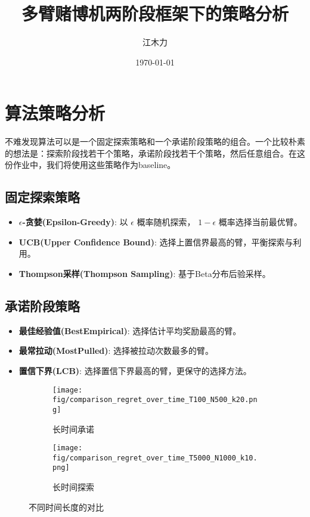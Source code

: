 \documentclass[6pt, a4paper]{ctexart} %
\title{多臂赌博机两阶段框架下的策略分析}
\author{江木力}
\date{\today}
\newcommand{\eps}{\ensuremath{\epsilon}} %
\begin{document}
\maketitle

\section{算法策略分析}
不难发现算法可以是一个固定探索策略和一个承诺阶段策略的组合。一个比较朴素的想法是：探索阶段找若干个策略，承诺阶段找若干个策略，然后任意组合。在这份作业中，我们将使用这些策略作为baseline。

\subsection{固定探索策略}
\begin{itemize}
    \item \textbf{$\eps$-贪婪(Epsilon-Greedy)}: 以 $\eps$ 概率随机探索， $1-\eps$ 概率选择当前最优臂。
    \item \textbf{UCB(Upper Confidence Bound)}: 选择上置信界最高的臂，平衡探索与利用。
    \item \textbf{Thompson采样(Thompson Sampling)}: 基于Beta分布后验采样。
\end{itemize}

\subsection{承诺阶段策略}
\begin{itemize}
    \item \textbf{最佳经验值(BestEmpirical)}: 选择估计平均奖励最高的臂。
    \item \textbf{最常拉动(MostPulled)}: 选择被拉动次数最多的臂。
    \item \textbf{置信下界(LCB)}: 选择置信下界最高的臂，更保守的选择方法。
\end{itemize}
\begin{figure}[htbp]
    \centering
    \begin{subfigure}[b]{0.48\textwidth}
        \texttt{[image: fig/comparison\_regret\_over\_time\_T100\_N500\_k20.png]}
        \caption{长时间承诺}
        \label{fig:image1}
    \end{subfigure}
    \hfill
    \begin{subfigure}[b]{0.48\textwidth}
        \texttt{[image: fig/comparison\_regret\_over\_time\_T5000\_N1000\_k10.png]}
        \caption{长时间探索}
        \label{fig:image2}
    \end{subfigure}
    \caption{不同时间长度的对比}
    \label{fig:time_comparison}
\end{figure}
\end{document}
